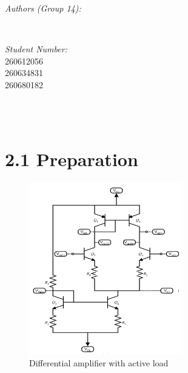 \documentclass[12pt]{article}
\makeatletter
\let\theauthor\@author
\let\thedate\@date
\makeatother
\begin{document}
\begin{titlepage}
\begin{minipage}{0.4\textwidth}
\begin{flushleft}
            \emph{Authors (Group 14):}\\
            \theauthor
            \end{flushleft}
            \end{minipage}~
            \begin{minipage}{0.4\textwidth}
            \begin{flushright} \large
            \emph{Student Number:} \\
            260612056 \\ 260634831 \\ 260680182                                  %
        \end{flushright}
    \end{minipage}\\[2 cm]
 
    {\large \thedate}\\[2 cm]
 
    \vfill
    
\end{titlepage}


\section*{2.1 Preparation}

\begin{figure}[H]
\centering
\includegraphics[width=0.6\textwidth]{op_amp.PNG}
\caption{\label{fig:op-amp} Differential amplifier with active load}
\end{figure}
\end{document}
